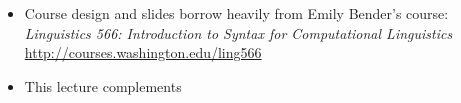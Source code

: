 \documentclass[a4paper,landscape,headrule,footrule]{foils}
\begin{document}

\begin{itemize}
\item Course design and slides borrow heavily from Emily Bender's course:
\textit{Linguistics 566: Introduction to Syntax for Computational Linguistics}
\\ \url{http://courses.washington.edu/ling566}
\item This lecture complements \citet[Chapter 10]{sag:wasow:bender:2003}
\end{itemize}


\end{document}
